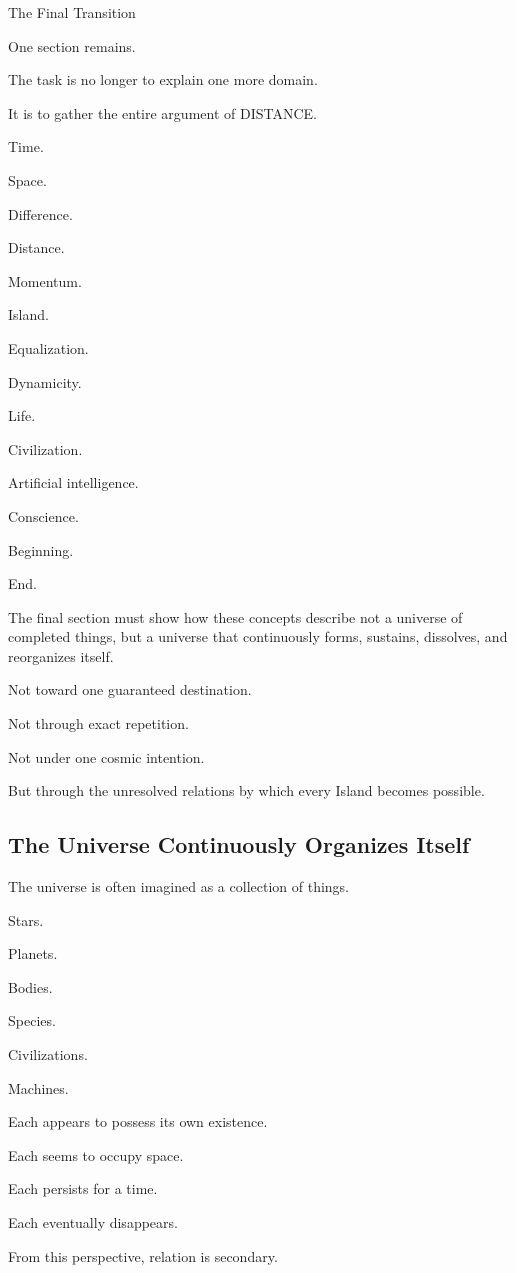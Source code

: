 The Final Transition

One section remains.

The task is no longer to explain one more domain.

It is to gather the entire argument of DISTANCE.

Time.

Space.

Difference.

Distance.

Momentum.

Island.

Equalization.

Dynamicity.

Life.

Civilization.

Artificial intelligence.

Conscience.

Beginning.

End.

The final section must show how these concepts describe not a universe of completed things, but a universe that continuously forms, sustains, dissolves, and reorganizes itself.

Not toward one guaranteed destination.

Not through exact repetition.

Not under one cosmic intention.

But through the unresolved relations by which every Island becomes possible.

\subsection*{\textbf{The Universe Continuously Organizes Itself}} 

The universe is often imagined as a collection of things.

Stars.

Planets.

Bodies.

Species.

Civilizations.

Machines.

Each appears to possess its own existence.

Each seems to occupy space.

Each persists for a time.

Each eventually disappears.

From this perspective, relation is secondary.

